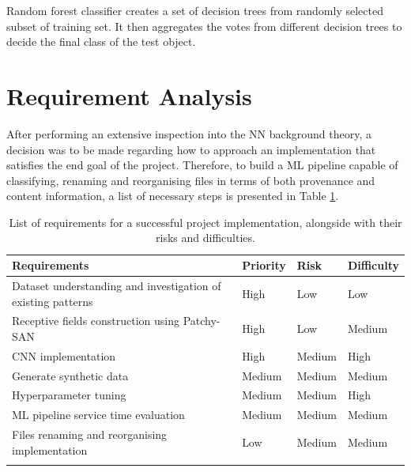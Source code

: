 Random forest classifier creates a set of decision trees from randomly selected subset of training set. It then aggregates the votes from different decision trees to decide the final class of the test object. \\

\section{Requirement Analysis} \label{Requirement Analysis}

After performing an extensive inspection into the NN background theory, a decision was to be made regarding how to approach an implementation that satisfies the end goal of the project. Therefore, to build a ML pipeline capable of classifying, renaming and reorganising files in terms of both provenance and content information, a list of necessary steps is presented in Table \ref{Requirements overview}. \bigskip

\begin{longtable}{|p{}|p{}|p{}|p{}|}
  \hline
  \textbf{Requirements}                                        & \textbf{Priority} & \textbf{Risk} & \textbf{Difficulty} \\
  \hline
  Dataset understanding and investigation of existing patterns & High              & Low           & Low                 \\

  Receptive fields construction using Patchy-SAN               & High              & Low           & Medium              \\

  CNN implementation                                           & High              & Medium        & High                \\

  Generate synthetic data                                      & Medium            & Medium        & Medium              \\

  Hyperparameter tuning                                        & Medium            & Medium        & High                \\

  ML pipeline service time evaluation                          & Medium            & Medium        & Medium              \\

  Files renaming and reorganising implementation               & Low               & Medium        & Medium              \\

  \hline
  \caption[Requirements overview]{List of requirements for a successful project implementation, alongside with their risks and difficulties.}
  \label{Requirements overview}
\end{longtable} \bigskip


